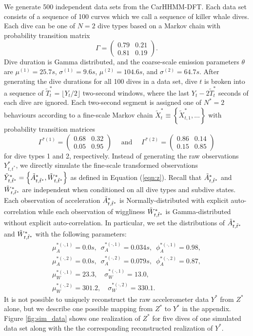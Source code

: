 We generate 500 independent data sets from the CarHHMM-DFT. Each data set consists of a sequence of 100 curves which we call a sequence of killer whale dives. Each dive can be one of $N=2$ dive types based on a Markov chain with probability transition matrix
%
$$\Gamma = \begin{pmatrix} 0.79 & 0.21 \\ 0.81 & 0.19 \end{pmatrix}.$$
%
Dive duration is Gamma distributed, and the coarse-scale emission parameters $\theta$ are $\mu^{(1)} = 25.7s$, $\sigma^{(1)} = 9.6s$, $\mu^{(2)} = 104.6s$, and $\sigma^{(2)} = 64.7s$. After generating the dive durations for all 100 dives in a data set, dive $t$ is broken into a sequence of $\tilde T^*_t = \lfloor Y_t/2 \rfloor$ two-second windows, where the last $Y_t - 2 \tilde T^*_t$ seconds of each dive are ignored. Each two-second segment is assigned one of $N^*=2$ behaviours according to a fine-scale Markov chain $\tilde X^*_t \equiv \left\{\tilde X^*_{t,1}, \ldots \right\}$ with probability transition matrices
%
$$\Gamma^{*(1)} = \begin{pmatrix} 0.68 & 0.32 \\ 0.05 & 0.95 \end{pmatrix} \quad \text{ and } \quad \Gamma^{*(2)} = \begin{pmatrix} 0.86 & 0.14 \\ 0.15 & 0.85 \end{pmatrix}$$ 
%
for dive types 1 and 2, respectively.
Instead of generating the raw observations $Y^*_{t,t^*}$, we directly simulate the fine-scale transformed observations $\tilde{Y}^*_{t,\tilde t^*} = \left\{\tilde{A}^*_{t,\tilde t^*}, \tilde{W}^*_{t,\tilde t^*}\right\}$ as defined in Equation (\ref{eqn:z}). Recall that $\tilde{A}^*_{t,\tilde t^*}$ and $\tilde{W}^*_{t,\tilde t^*}$ are independent when conditioned on all dive types and subdive states. Each observation of acceleration $\tilde{A}^*_{t,\tilde t^*}$ is Normally-distributed with explicit auto-correlation while each observation of wiggliness $\tilde{W}^*_{t,\tilde t^*}$ is Gamma-distributed without explicit auto-correlation. In particular, we set the distributions of $\tilde{A}^*_{t,\tilde t^*}$ and $\tilde{W}^*_{t,\tilde t^*}$ with the following parameters:
%
\begin{gather*}
    \mu_A^{*(\cdot,1)} = 0.0 s, \enspace \sigma_A^{*(\cdot,1)} = 0.034s, \enspace \phi_A^{*(\cdot,1)} = 0.98, \\
    \mu_A^{*(\cdot,2)} = 0.0 s, \enspace \sigma_A^{*(\cdot,2)} = 0.079s, \enspace \phi_A^{*(\cdot,2)} = 0.87, \\
    \mu_W^{*(\cdot,1)} = 23.3, \quad \sigma_W^{*(\cdot,1)} = 13.0, \\
    \mu_W^{*(\cdot,2)} = 301.2, \quad \sigma_W^{*(\cdot,2)} = 330.1.
\end{gather*}
%
It is not possible to uniquely reconstruct the raw accelerometer data $Y^*$ from $Z^*$ alone, but we describe one possible mapping from $Z^*$ to $Y^*$ in the appendix. Figure \ref{fig:sim_data} shows one realization of $Z^*$ for five dives of one simulated data set along with the the corresponding reconstructed realization of $Y^*$. 

